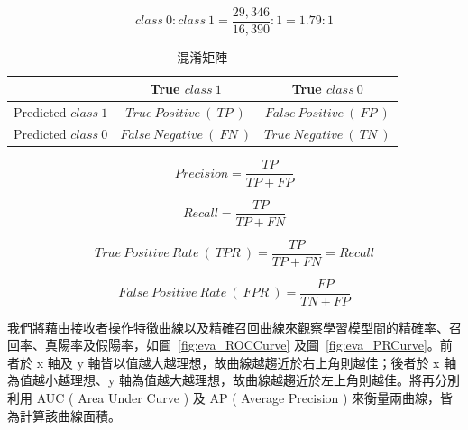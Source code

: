 \begin{equation}
    \label{eq:SampleWeightCalculation}
    class\ 0 : class\ 1 = \frac{29,346}{16,390} : 1 = 1.79 : 1
\end{equation}

\begin{table}[!htb]
	\centering
	\begin{tabular}{|c|c|c|}
	\hline
	& True $class\ 1$ & True $class\ 0$ \\
    \hline
    Predicted $class\ 1$ & $True\ Positive\ (\ TP\ )$ & $False\ Positive\ (\ FP\ )$ \\
    \hline
    Predicted $class\ 0$ & $False\ Negative\ (\ FN\ )$ & $True\ Negative\ (\ TN\ )$ \\
    \hline
	\end{tabular}
	\caption[混淆矩陣]{混淆矩陣}
	\label{tab:ConfusionMatrix}
\end{table}

\begin{equation}
    \label{eq:PrecisionFormula}
    Precision = \frac{TP}{TP + FP}
\end{equation}

\begin{equation}
    \label{eq:RecallFormula}
    Recall = \frac{TP}{TP + FN}
\end{equation}

\begin{equation}
    \label{eq:TPRFormula}
    True\ Positive\ Rate\ (\ TPR\ ) = \frac{TP}{TP + FN} = Recall
\end{equation}

\begin{equation}
    \label{eq:FPRFormula}
    False\ Positive\ Rate\ (\ FPR\ ) = \frac{FP}{TN + FP}
\end{equation}
\newpage

我們將藉由接收者操作特徵曲線以及精確召回曲線來觀察學習模型間的精確率、召回率、真陽率及假陽率，如圖~\ref{fig:eva_ROCCurve} 及圖~\ref{fig:eva_PRCurve}。前者於 x 軸及 y 軸皆以值越大越理想，故曲線越趨近於右上角則越佳；後者於 x 軸為值越小越理想、y 軸為值越大越理想，故曲線越趨近於左上角則越佳。將再分別利用 AUC ( Area Under Curve ) 及 AP ( Average Precision ) 來衡量兩曲線，皆為計算該曲線面積。

